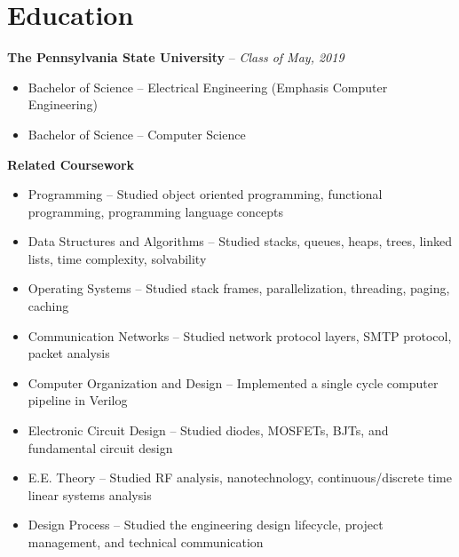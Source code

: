 \documentclass[letterpaper,10pt]{article}
\begin{document}
\section{Education}
\textbf{The Pennsylvania State University} -- \textit{Class of May, 2019}
{\setlength{\parskip}{0pt}\begin{itemize}
\item Bachelor of Science -- Electrical Engineering (Emphasis Computer Engineering)
\item Bachelor of Science -- Computer Science
\end{itemize}}

\textbf{Related Coursework}
{\setlength{\parskip}{0pt}\begin{itemize}
\item Programming -- Studied object oriented programming, functional programming, programming language concepts
\item Data Structures and Algorithms -- Studied stacks, queues, heaps, trees, linked lists, time complexity, solvability
\item Operating Systems -- Studied stack frames, parallelization, threading, paging, caching
\item Communication Networks -- Studied network protocol layers, SMTP protocol, packet analysis
\item Computer Organization and Design -- Implemented a single cycle computer pipeline in Verilog
\item Electronic Circuit Design -- Studied diodes, MOSFETs, BJTs, and fundamental circuit design
\item E.E. Theory -- Studied RF analysis, nanotechnology, continuous/discrete time linear systems analysis
\item Design Process -- Studied the engineering design lifecycle, project management, and technical communication
\end{itemize}}
\end{document}
